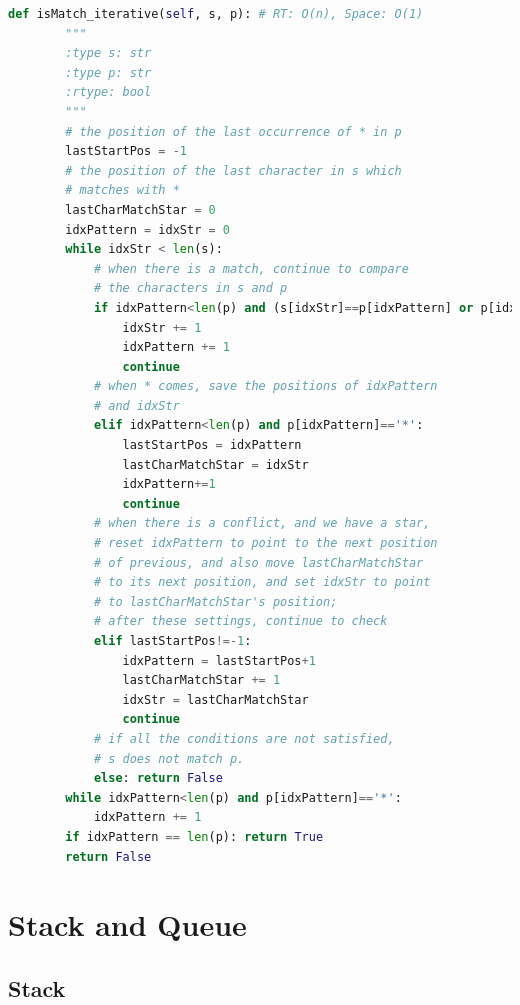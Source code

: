 \documentclass[a4paper,10pt]{article}
\begin{document}
\begin{lstlisting}[language=Python, caption=Problem44. Wildcard Matching]
    def isMatch_iterative(self, s, p): # RT: O(n), Space: O(1)
        """
        :type s: str
        :type p: str
        :rtype: bool
        """
        # the position of the last occurrence of * in p
        lastStartPos = -1
        # the position of the last character in s which 
        # matches with *
        lastCharMatchStar = 0
        idxPattern = idxStr = 0
        while idxStr < len(s):
            # when there is a match, continue to compare 
            # the characters in s and p
            if idxPattern<len(p) and (s[idxStr]==p[idxPattern] or p[idxPattern]=='?'):
                idxStr += 1
                idxPattern += 1
                continue
            # when * comes, save the positions of idxPattern
            # and idxStr
            elif idxPattern<len(p) and p[idxPattern]=='*':
                lastStartPos = idxPattern
                lastCharMatchStar = idxStr
                idxPattern+=1
                continue
            # when there is a conflict, and we have a star, 
            # reset idxPattern to point to the next position 
            # of previous, and also move lastCharMatchStar 
            # to its next position, and set idxStr to point 
            # to lastCharMatchStar's position; 
            # after these settings, continue to check
            elif lastStartPos!=-1:
                idxPattern = lastStartPos+1
                lastCharMatchStar += 1
                idxStr = lastCharMatchStar
                continue
            # if all the conditions are not satisfied, 
            # s does not match p.
            else: return False
        while idxPattern<len(p) and p[idxPattern]=='*':
            idxPattern += 1
        if idxPattern == len(p): return True
        return False
\end{lstlisting}








\section{Stack and Queue}

\subsection{Stack}
\end{document}
